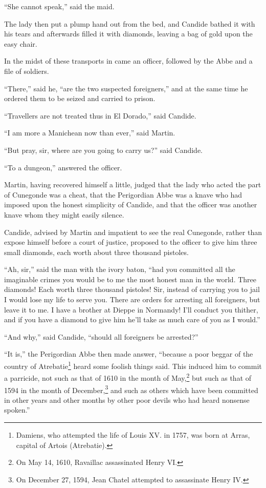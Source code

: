 ``She cannot speak,'' said the maid.

The lady then put a plump hand out from the bed, and Candide bathed it with his tears and afterwards filled it with diamonds, leaving a bag of gold upon the easy chair.

In the midst of these transports in came an officer, followed by the Abbe and a file of soldiers.

``There,'' said he, ``are the two suspected foreigners,'' and at the same time he ordered them to be seized and carried to prison.

``Travellers are not treated thus in El Dorado,'' said Candide.

``I am more a Manichean now than ever,'' said Martin.

``But pray, sir, where are you going to carry us?'' said Candide.

``To a dungeon,'' answered the officer.

Martin, having recovered himself a little, judged that the lady who acted the part of Cunegonde was a cheat, that the Perigordian Abbe was a knave who had imposed upon the honest simplicity of Candide, and that the officer was another knave whom they might easily silence.

Candide, advised by Martin and impatient to see the real Cunegonde, rather than expose himself before a court of justice, proposed to the officer to give him three small diamonds, each worth about three thousand pistoles.

``Ah, sir,'' said the man with the ivory baton, ``had you committed all the imaginable crimes you would be to me the most honest man in the world. Three diamonds! Each worth three thousand pistoles! Sir, instead of carrying you to jail I would lose my life to serve you. There are orders for arresting all foreigners, but leave it to me. I have a brother at Dieppe in Normandy! I'll conduct you thither, and if you have a diamond to give him he'll take as much care of you as I would.''

``And why,'' said Candide, ``should all foreigners be arrested?''

``It is,'' the Perigordian Abbe then made answer, ``because a poor beggar of the country of Atrebatie\footnote{Damiens, who attempted the life of Louis XV. in 1757, was born at Arras, capital of Artois (Atrebatie).} heard some foolish things said. This induced him to commit a parricide, not such as that of 1610 in the month of May,\footnote{On May 14, 1610, Ravaillac assassinated Henry VI.} but such as that of 1594 in the month of December,\footnote{On December 27, 1594, Jean Chatel attempted to assassinate Henry IV.} and such as others which have been committed in other years and other months by other poor devils who had heard nonsense spoken.''


